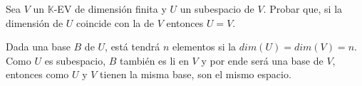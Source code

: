 \item Sea $V$ un $\mathbb{K}$-EV de dimensión finita y $U$ un subespacio de $V$. Probar que, si la dimensión de $U$ coincide con la de $V$ entonces $U=V$.
    \begin{mdframed}[style=s]
        Dada una base $B$ de $U$, está tendrá $n$ elementos si la $dim(U)=dim(V)=n$. Como $U$ es subespacio, $B$ también es li en $V$ y por ende será una base de $V$, entonces como $U$ y $V$ tienen la misma base, son el mismo espacio.
    \end{mdframed}